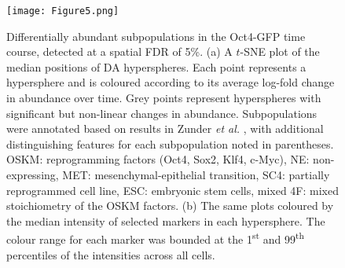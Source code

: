\documentclass{article}
\begin{document}
\begin{figure}[p]
    \begin{center}
    \texttt{[image: Figure5.png]}
\end{center}
    \caption{
        Differentially abundant subpopulations in the Oct4-GFP time course, detected at a spatial FDR of 5\%.
        (a) A $t$-SNE plot of the median positions of DA hyperspheres. 
        Each point represents a hypersphere and is coloured according to its average log-fold change in abundance over time.
        Grey points represent hyperspheres with significant but non-linear changes in abundance.
        Subpopulations were annotated based on results in Zunder \emph{et al.} \cite{zunder2015continuous}, with additional distinguishing features for each subpopulation noted in parentheses.
        OSKM: reprogramming factors (Oct4, Sox2, Klf4, c-Myc), NE: non-expressing, MET: mesenchymal-epithelial transition, SC4: partially reprogrammed cell line, ESC: embryonic stem cells, mixed 4F: mixed stoichiometry of the OSKM factors.
        (b) The same plots coloured by the median intensity of selected markers in each hypersphere.
        The colour range for each marker was bounded at the 1\textsuperscript{st} and 99\textsuperscript{th} percentiles of the intensities across all cells.
    }

    \label{fig:oct4}
\end{figure}
\end{document}
